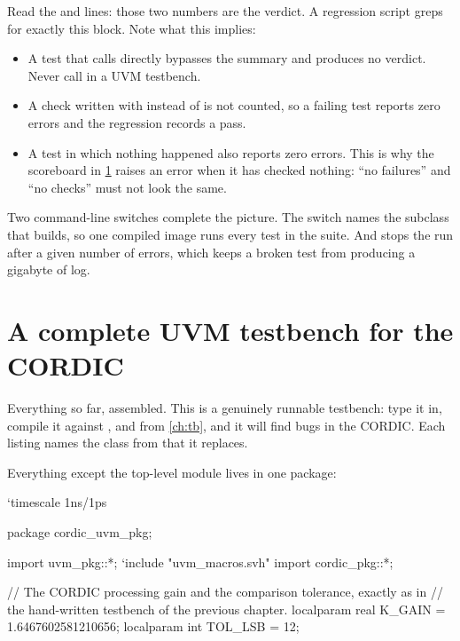 Read the  and  lines: those two numbers are
the verdict. A regression script greps for exactly this block. Note what this
implies:

\begin{itemize}
  \item A test that calls  directly bypasses the summary and
        produces no verdict. Never call  in a UVM testbench.
  \item A check written with  instead of 
        is not counted, so a failing test reports zero errors and the
        regression records a pass.
  \item A test in which nothing happened also reports zero errors. This is
        why the scoreboard in \cref{sec:uvm:complete} raises an error when
        it has checked nothing: ``no failures'' and ``no checks'' must not look
        the same.
\end{itemize}

%
Two command-line switches complete the picture. The switch
 names the  subclass that
 builds, so one compiled image runs every test in the
suite. And
 stops the run after a given number of errors,
which keeps a broken test from producing a gigabyte of log.

\section{A complete UVM testbench for the CORDIC}
\label{sec:uvm:complete}

Everything so far, assembled. This is a genuinely runnable testbench: type it
in, compile it against ,  and
 from \cref{ch:tb}, and it will find bugs in the CORDIC.
Each listing names the class from  that it replaces.

Everything except the top-level module lives in one package:

\begin{uvmcode}[caption={Package header},label={lst:uvm:pkg}]
`timescale 1ns/1ps

package cordic_uvm_pkg;

  import uvm_pkg::*;
  `include "uvm_macros.svh"
  import cordic_pkg::*;

  // The CORDIC processing gain and the comparison tolerance, exactly as in
  // the hand-written testbench of the previous chapter.
  localparam real K_GAIN  = 1.6467602581210656;
  localparam int  TOL_LSB = 12;
\end{uvmcode}

